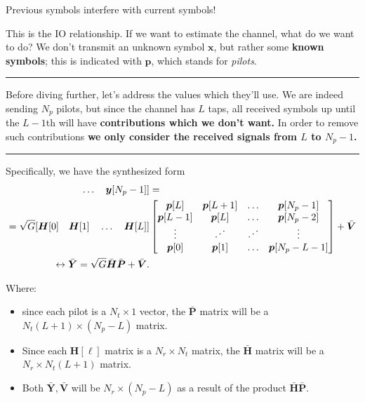 \documentclass[a4paper, 12pt]{book}
\begin{document}
Previous symbols interfere with current symbols!

This is the IO relationship. If we want to estimate the channel, what do we want to do?
We don't transmit an unknown symbol $\boldsymbol{x}$, but rather some \textbf{known symbols}; this is indicated with $\boldsymbol{p}$, which stands for \textit{pilots}.

\noindent\rule{\textwidth}{0.4pt}

Before diving further, let's address the values which they'll use.
We are indeed sending $N_p$ pilots, but since the channel has $L$ taps, all received symbols up until the $L-1$th will have \textbf{contributions which we don't want.}
In order to remove such contributions \textbf{we only consider the received signals from $L$ to $N_p-1$.}

\noindent\rule{\textwidth}{0.4pt}

Specifically, we have the synthesized form
\begin{align}
[\boldsymbol{y}[L] \quad \dots \quad \boldsymbol{y}[N_p-1]] &= \notag \\
= \sqrt{G} [\boldsymbol{H}[0] \quad \boldsymbol{H}[1] \quad \dots \quad \boldsymbol{H}[L]]
&\begin{bmatrix}
\boldsymbol{p}[L] & \boldsymbol{p}[L+1] & \dots & \boldsymbol{p}[N_p-1] \\
\boldsymbol{p}[L-1] & \boldsymbol{p}[L] & \dots & \boldsymbol{p}[N_p-2] \\
\vdots & \reflectbox{$\ddots$} & \reflectbox{$\ddots$} & \vdots \\
\boldsymbol{p}[0] & \boldsymbol{p}[1] & \dots & \boldsymbol{p}[N_p-L-1]
\end{bmatrix} + \bar{\boldsymbol{V}} \notag \\
\leftrightarrow \bar{\boldsymbol{Y}} = \sqrt{G}\bar{\boldsymbol{H}}\bar{\boldsymbol{P}} + \bar{\boldsymbol{V}}.
\end{align}

Where:
\begin{itemize}
    \item since each pilot is a $N_t \times 1$ vector, the $\bar{\boldsymbol{P}}$ matrix will be a $N_t(L+1) \times (N_p - L)$ matrix.
    \item Since each $\boldsymbol{H}[\ell]$ matrix is a $N_r \times N_t$ matrix, the $\bar{\boldsymbol{H}}$ matrix will be a $N_r \times N_t(L+1)$ matrix.
    \item Both $\bar{\boldsymbol{Y}}, \bar{\boldsymbol{V}}$ will be $N_r \times (N_p - L)$ as a result of the product $\bar{\boldsymbol{H}}\bar{\boldsymbol{P}}$.
\end{itemize}
\end{document}
